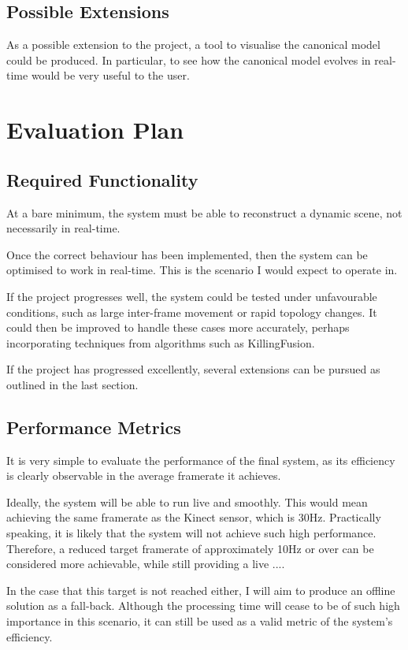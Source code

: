 \documentclass[a4paper]{article}
\begin{document}
\subsection{Possible Extensions}

As a possible extension to the project, a tool to visualise the canonical model could be produced. In particular, to see how the canonical model evolves in real-time would be very useful to the user.


\section{Evaluation Plan}
\subsection{Required Functionality}

At a bare minimum, the system must be able to reconstruct a dynamic scene, not necessarily in real-time. 

Once the correct behaviour has been implemented, then the system can be optimised to work in real-time. This is the scenario I would expect to operate in.

If the project progresses well, the system could be tested under unfavourable conditions, such as large inter-frame movement or rapid topology changes. It could then be improved to handle these cases more accurately, perhaps incorporating techniques from algorithms such as KillingFusion.

If the project has progressed excellently, several extensions can be pursued as outlined in the last section.


\subsection{Performance Metrics}

It is very simple to evaluate the performance of the final system, as its efficiency is clearly observable in the average framerate it achieves.

Ideally, the system will be able to run live and smoothly. This would mean achieving the same framerate as the Kinect sensor, which is 30Hz.  Practically speaking, it is likely that the system will not achieve such high performance. Therefore, a reduced target framerate of approximately 10Hz or over can be considered more achievable, while still providing a live ....

In the case that this target is not reached either, I will aim to produce an offline solution as a fall-back. Although the processing time will cease to be of such high importance in this scenario, it can still be used as a valid metric of the system's efficiency.




\end{document}
